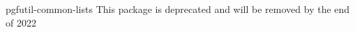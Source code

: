 %
%
%

%
%
%

\pgfutil@packagewarning
  {pgfutil-common-lists}%
  {This package is deprecated and will be removed by the end of 2022}

\def\pgfapplistnewempty#1{%
    \expandafter\let\csname pgfapp@#1\endcsname=\pgfutil@empty
    \expandafter\let\csname pgfapp@#1@smallbuf\endcsname=\pgfutil@empty
    \expandafter\let\csname pgfapp@#1@bigbuf\endcsname=\pgfutil@empty
    \expandafter\def\csname pgfapp@#1@smallbuf@c\endcsname{0}%
    \expandafter\def\csname pgfapp@#1@bigbuf@c\endcsname{0}%
}%

